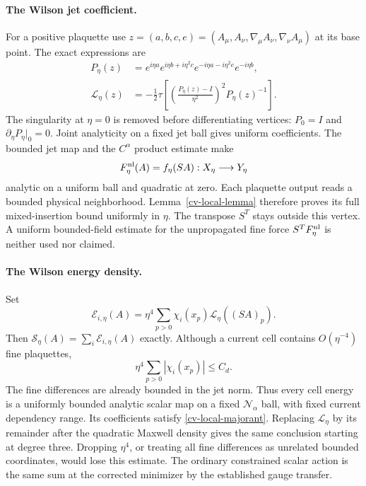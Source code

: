 \paragraph{The Wilson jet coefficient.}
For a positive plaquette use
$z=(a,b,c,e)=(A_\mu,A_\nu,\nabla_\mu A_\nu,
\nabla_\nu A_\mu)$ at its base point. The exact expressions are
\begin{equation}\label{cv-wilson-jet}
 \begin{split}
 P_\eta(z)&=e^{i\eta a}e^{i\eta b+i\eta^2c}
                 e^{-i\eta a-i\eta^2e}e^{-i\eta b},\\
 \mathcal L_\eta(z)&=-\frac12\tau\left[
       \left(\frac{P_\eta(z)-I}{\eta^2}\right)^2
                                      P_\eta(z)^{-1}\right].
 \end{split}
\end{equation}
The singularity at $\eta=0$ is removed before differentiating
vertices: $P_0=I$ and $\partial_\eta P_\eta|_0=0$.
Joint analyticity on a fixed jet ball gives uniform
coefficients. The bounded jet map and the $C^\alpha$
product estimate make
\[
 F_\eta^{\rm nl}(A)=f_\eta(SA):X_\eta\longrightarrow Y_\eta
\]
analytic on a uniform ball and quadratic at zero. Each
plaquette output reads a bounded physical neighborhood.
Lemma~\ref{cv-local-lemma} therefore proves its full
mixed-insertion bound uniformly in $\eta$.
The transpose $S^T$ stays outside this vertex. A uniform
bounded-field estimate for the unpropagated fine force
$S^TF_\eta^{\rm nl}$ is neither used nor claimed.

\paragraph{The Wilson energy density.}
Set
\begin{equation}\label{cv-cell-energy}
 \mathcal E_{i,\eta}(A)=\eta^4\sum_{p>0}
       \chi_i(x_p)\mathcal L_\eta((SA)_p).
\end{equation}
Then $\mathcal S_\eta(A)=\sum_i\mathcal E_{i,\eta}(A)$
exactly. Although a current cell contains $O(\eta^{-4})$
fine plaquettes,
\begin{equation}\label{cv-cell-mass}
 \eta^4\sum_{p>0}|\chi_i(x_p)|\le C_d.
\end{equation}
The fine differences are already bounded in the jet norm.
Thus every cell energy is a uniformly bounded analytic
scalar map on a fixed $\mathcal N_\alpha$ ball, with fixed
current dependency range. Its coefficients satisfy
\eqref{cv-local-majorant}. Replacing $\mathcal L_\eta$ by
its remainder after the quadratic Maxwell density gives
the same conclusion starting at degree three. Dropping
$\eta^4$, or treating all fine differences as unrelated
bounded coordinates, would lose this estimate.
The ordinary constrained scalar action is the same sum at
the corrected minimizer by the established gauge transfer.

